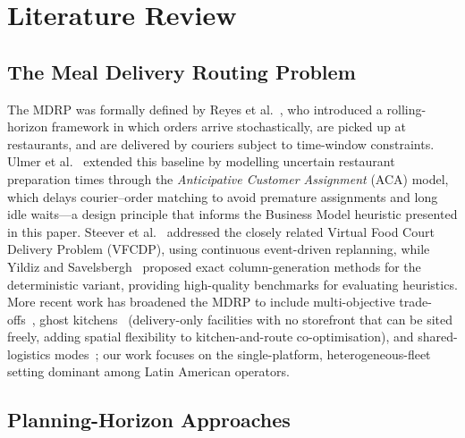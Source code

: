
\section{Literature Review}\label{sec:litreview}

\subsection{The Meal Delivery Routing Problem}\label{subsec:mdrp}

The MDRP was formally defined by Reyes et al.~\cite{reyes2018mdrp},
who introduced a rolling-horizon framework in which orders arrive
stochastically, are picked up at restaurants, and are delivered by
couriers subject to time-window constraints.
Ulmer et al.~\cite{ulmer2021restaurant} extended this baseline by
modelling uncertain restaurant preparation times through the
\emph{Anticipative Customer Assignment} (ACA) model, which delays
courier--order matching to avoid premature assignments and long idle
waits—a design principle that informs the Business Model heuristic
presented in this paper.
Steever et al.~\cite{steever2019dynamic} addressed the closely
related Virtual Food Court Delivery Problem (VFCDP), using
continuous event-driven replanning, while Yildiz and
Savelsbergh~\cite{yildiz2019provably} proposed exact
column-generation methods for the deterministic variant, providing
high-quality benchmarks for evaluating heuristics.
More recent work has broadened the MDRP to include multi-objective
trade-offs~\cite{dusadeerungsikul2023multiobjective},
ghost kitchens~\cite{neria2024ghost} (delivery-only facilities with
no storefront that can be sited freely, adding spatial flexibility
to kitchen-and-route co-optimisation), and shared-logistics
modes~\cite{bi2023shared}; our work focuses on the single-platform,
heterogeneous-fleet setting dominant among Latin American operators.

\subsection{Planning-Horizon Approaches}\label{subsec:horizon}

